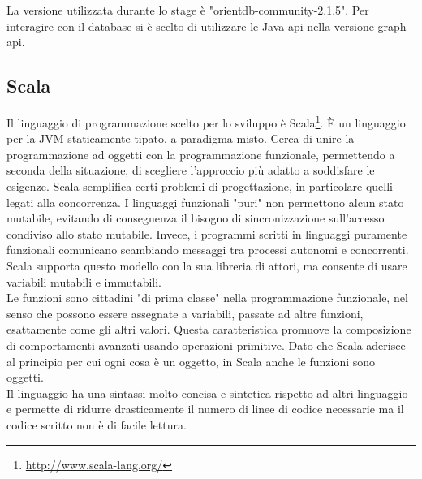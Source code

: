 La versione utilizzata durante lo stage è "orientdb-community-2.1.5". Per interagire con il database si è scelto di utilizzare le Java \gls{api} nella versione graph \gls{api}.

\subsection*{Scala}
Il linguaggio di programmazione scelto per lo sviluppo è Scala\footnote{\url{http://www.scala-lang.org/}}. È un linguaggio per la \gls{JVM} staticamente tipato, a paradigma misto. Cerca di unire la programmazione ad oggetti con la programmazione funzionale, permettendo a seconda della situazione, di scegliere l'approccio più adatto a soddisfare le esigenze.  Scala semplifica certi problemi di progettazione, in particolare quelli legati alla concorrenza. I linguaggi funzionali "puri" non permettono alcun stato mutabile, evitando di conseguenza il bisogno di sincronizzazione sull'accesso condiviso allo stato mutabile. Invece, i programmi scritti in linguaggi puramente funzionali comunicano scambiando messaggi tra processi autonomi e concorrenti. Scala supporta questo modello con la sua libreria di attori, ma consente di usare variabili mutabili e immutabili.\\
Le funzioni sono cittadini "di prima classe" nella programmazione funzionale, nel senso che possono essere assegnate a variabili, passate ad altre funzioni, esattamente come gli altri valori. Questa caratteristica promuove la composizione di comportamenti avanzati usando operazioni primitive. Dato che Scala aderisce al principio per cui ogni cosa è un oggetto, in Scala anche le funzioni sono oggetti.\\ Il linguaggio ha una sintassi molto concisa e sintetica rispetto ad altri linguaggio e permette di ridurre drasticamente il numero di linee di codice necessarie ma il codice scritto non è di facile lettura.

